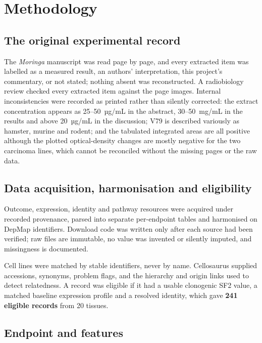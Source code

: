 \chapter{Methodology}\label{ch:methods}

\section{The original experimental record}

The \textit{Moringa} manuscript was read page by page, and every extracted item was labelled
as a measured result, an authors' interpretation, this project's commentary, or not stated;
nothing absent was reconstructed. A radiobiology review checked every extracted item against
the page images. Internal inconsistencies were recorded as printed rather than silently
corrected: the extract concentration appears as 25--50~µg/mL in the abstract, 30--50~mg/mL
in the results and above 20~µg/mL in the discussion; V79 is described variously as hamster,
murine and rodent; and the tabulated integrated areas are all positive although the plotted
optical-density changes are mostly negative for the two carcinoma lines, which cannot be
reconciled without the missing pages or the raw data.

\section{Data acquisition, harmonisation and eligibility}

Outcome, expression, identity and pathway resources were acquired under recorded
provenance, parsed into separate per-endpoint tables and harmonised on DepMap identifiers.
Download code was written only after each source had been verified; raw files are
immutable, no value was invented or silently imputed, and missingness is documented.

Cell lines were matched by stable identifiers, never by name. Cellosaurus supplied
accessions, synonyms, problem flags, and the hierarchy and origin links used to detect
relatedness. A record was eligible if it had a usable clonogenic SF2 value, a matched
baseline expression profile and a resolved identity, which gave \textbf{241 eligible
records} from 20 tissues.

\section{Endpoint and features}\label{sec:endpoint}

